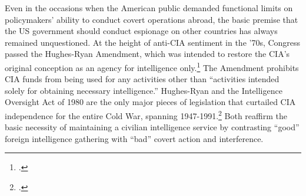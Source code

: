 \documentclass[11pt]{memoir}
\begin{document}
\begin{refsegment}
Even in the occasions when the American public demanded functional limits on policymakers' ability to conduct covert operations abroad, the basic premise that the US government should conduct espionage on other countries has always remained unquestioned. At the height of anti-CIA sentiment in the '70s, Congress passed the Hughes-Ryan Amendment, which was intended to restore the CIA's original conception as an agency for intelligence only.\footcite[p.~215]{andrew_missing_1984} The Amendment prohibits CIA funds from being used for any activities other than ``activities intended solely for obtaining necessary intelligence.'' Hughes-Ryan and the Intelligence Oversight Act of 1980 are the only major pieces of legislation that curtailed CIA independence for the entire Cold War, spanning 1947-1991.\footcite[p.~93-94]{cogan_covert_1993} Both reaffirm the basic necessity of maintaining a civilian intelligence service by contrasting ``good'' foreign intelligence gathering with ``bad'' covert action and interference.




\end{refsegment}
\end{document}
